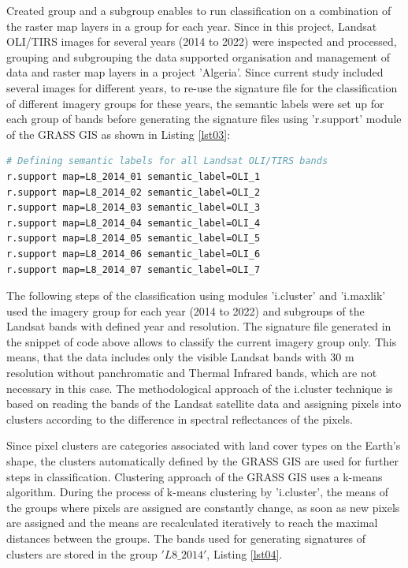 \documentclass[asi,article,submit,pdftex,moreauthors]{Definitions/mdpi}
\begin{document}
Created group and a subgroup enables to run classification on a combination of the raster map layers in a group for each year. Since in this project, Landsat OLI/TIRS images for several years (2014 to 2022) were inspected and processed, grouping and subgrouping the data supported organisation and management of data and raster map layers in a project 'Algeria'. Since current study included several images for different years, to re-use the signature file for the classification of different imagery groups for these years, the semantic labels were set up for each group of bands before generating the signature files using 'r.support' module of the GRASS GIS as shown in Listing \ref{lst03}: 

\begin{lstlisting}[language=bash,caption=GRASS GIS code for creating semantic labels for the Landsat OLI/TIRS,style=mystyle,label={lst03}]
# Defining semantic labels for all Landsat OLI/TIRS bands
r.support map=L8_2014_01 semantic_label=OLI_1
r.support map=L8_2014_02 semantic_label=OLI_2
r.support map=L8_2014_03 semantic_label=OLI_3
r.support map=L8_2014_04 semantic_label=OLI_4
r.support map=L8_2014_05 semantic_label=OLI_5
r.support map=L8_2014_06 semantic_label=OLI_6
r.support map=L8_2014_07 semantic_label=OLI_7
\end{lstlisting}

The following steps of the classification using modules 'i.cluster' and 'i.maxlik' used the imagery group for each year (2014 to 2022) and subgroups of the Landsat bands with defined year and resolution. The signature file generated in the snippet of code above allows to classify the current imagery group only. This means, that the data includes only the visible Landsat bands with 30 m resolution without panchromatic and Thermal Infrared bands, which are not necessary in this case. The methodological approach of the i.cluster technique is based on reading the bands of the Landsat satellite data and assigning pixels into clusters according to the difference in spectral reflectances of the pixels. 

Since pixel clusters are categories associated with land cover types on the Earth's shape, the clusters automatically defined by the GRASS GIS are used for further steps in classification. Clustering approach of the GRASS GIS uses a k-means algorithm. During the process of k-means clustering by 'i.cluster', the means of the groups where pixels are assigned are constantly change, as soon as new pixels are assigned and the means are recalculated iteratively to reach the maximal distances between the groups. The bands used for generating signatures of clusters are stored in the group $'L8\_2014'$, Listing \ref{lst04}.
\end{document}

